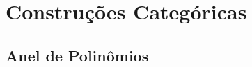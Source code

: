 \section{Construções Categóricas}

\subsection{Anel de Polinômios}

\begin{comment}

\begin{defi}
	Seja $\bm A$ um anel. O \emph{conjunto dos polinômios em $A$} é o conjunto
	\begin{equation*}
	A[x] := \set{\sum_{i=0}^m a_ix^i}{a_i \in A, m \geq 0},
	\end{equation*}
em que $a_0x^0 := a_0$. Os números $a_i$ são chamados de coeficientes do polinômio. Dizemos que dois polinômios são iguais se todos seus coeficientes não nulos são iguais.
\end{defi}

\begin{defi}
	 Seja $\bm A$ um anel e $f,g \in A[x]$ tais que $f := \sum_{i=0}^m a_ix^i$ e $g := \sum_{i=0}^n b_ix^i$. Então definimos as operações binárias $\oplus$ e $\odot$ em $A[x]$ por
	\begin{equation*}
	f \oplus g := \sum_{i=0}^{\max\{m,n\}} (a_i+b_i)x^i
	\qquad \qquad f \odot g := \sum_{i=0}^{m+n} \left(\sum_{j=0}^i a_jb_{i-j}\right)x^i.
	\end{equation*}
tal que $a_i=0$ para $m < i \leq \max\{m,n\}$ e $b_i=0$ para $n < i \leq \max\{m,n\}$. Denotaremos $\oplus$ e $\odot$ por $+$ e $\cdot$ quando não existir ambiguidade.
\end{defi}

\begin{prop}
	Seja $\bm A=(A,+,\cdot)$ um anel. Então $\bm{A[x]} := (A[x],\oplus,\odot)$ é um anel.
\end{prop}
\begin{proof}
	Sejam $f,g,h \in A[x]$ tais que $f := \sum_{i=0}^m a_ix^i$, $g := \sum_{i=0}^n b_ix^i$ e $h := \sum_{i=0}^l c_ix^i$. Notemos que $\max\{\max\{m,n\},l\}=\max\{m,\max\{n,l\}\}$. Denotamos essa quantidade como $\max\{m,n,l\}$. Definamos $a_i=0$ para $m < i \leq \max\{m,n,l\}$, $b_i=0$ para $n < i \leq \max\{m,n,l\}$ e $c_i=0$ para $l < i \leq \max\{m,n,l\}$.


\end{comment}
